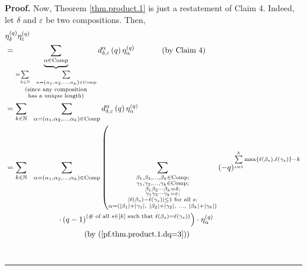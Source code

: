 \documentclass[numbers=enddot,12pt,final,onecolumn,notitlepage]{scrartcl}%
\theoremstyle{definition}
\newenvironment{proof}[1][Proof]{\noindent\textbf{#1.} }{\ \rule{0.5em}{0.5em}}
\let\sumnonlimits\sum
\renewcommand{\sum}{\sumnonlimits\limits}
\begin{document}
\begin{proof}
Now, Theorem \ref{thm.product.1} is just a restatement of Claim 4. Indeed, let
$\delta$ and $\varepsilon$ be two compositions. Then,%
\begin{align*}
&  \eta_{\delta}^{\left(  q\right)  }\eta_{\varepsilon}^{\left(  q\right)  }\\
&  =\underbrace{\sum_{\alpha\in\operatorname*{Comp}}}_{\substack{=\sum
_{k\in\mathbb{N}}\ \ \sum_{\alpha=\left(  \alpha_{1},\alpha_{2},\ldots
,\alpha_{k}\right)  \in\operatorname*{Comp}}\\\text{(since any composition}%
\\\text{has a unique length)}}}d_{\delta,\varepsilon}^{\alpha}\left(
q\right)  \eta_{\alpha}^{\left(  q\right)  }\ \ \ \ \ \ \ \ \ \ \left(
\text{by Claim 4}\right) \\
&  =\sum_{k\in\mathbb{N}}\ \ \sum_{\alpha=\left(  \alpha_{1},\alpha_{2}%
,\ldots,\alpha_{k}\right)  \in\operatorname*{Comp}}d_{\delta,\varepsilon
}^{\alpha}\left(  q\right)  \eta_{\alpha}^{\left(  q\right)  }\\
&  =\sum_{k\in\mathbb{N}}\ \ \sum_{\alpha=\left(  \alpha_{1},\alpha_{2}%
,\ldots,\alpha_{k}\right)  \in\operatorname*{Comp}}\left(  \sum
_{\substack{\beta_{1},\beta_{2},\ldots,\beta_{k}\in\operatorname*{Comp}%
;\\\gamma_{1},\gamma_{2},\ldots,\gamma_{k}\in\operatorname*{Comp};\\\beta
_{1}\beta_{2}\cdots\beta_{k}=\delta;\\\gamma_{1}\gamma_{2}\cdots\gamma
_{k}=\varepsilon;\\\left\vert \ell\left(  \beta_{s}\right)  -\ell\left(
\gamma_{s}\right)  \right\vert \leq1\text{ for all }s;\\\alpha=\left(
\left\vert \beta_{1}\right\vert +\left\vert \gamma_{1}\right\vert
,\ \left\vert \beta_{2}\right\vert +\left\vert \gamma_{2}\right\vert
,\ \ldots,\ \left\vert \beta_{k}\right\vert +\left\vert \gamma_{k}\right\vert
\right)  }}\left(  -q\right)  ^{\sum_{s=1}^{k}\max\left\{  \ell\left(
\beta_{s}\right)  ,\ell\left(  \gamma_{s}\right)  \right\}  -k}\right. \\
&  \ \ \ \ \ \ \ \ \ \ \ \ \ \ \ \ \ \ \ \ \left.  \cdot\left(  q-1\right)
^{\left(  \text{\# of all }s\in\left[  k\right]  \text{ such that }\ell\left(
\beta_{s}\right)  =\ell\left(  \gamma_{s}\right)  \right)  }\right)  \cdot
\eta_{\alpha}^{\left(  q\right)  }\\
&  \ \ \ \ \ \ \ \ \ \ \ \ \ \ \ \ \ \ \ \ \ \ \ \ \ \ \ \ \ \ \left(
\text{by (\ref{pf.thm.product.1.dq=3})}\right) \\

\end{align*}
\end{proof}
\end{document}
